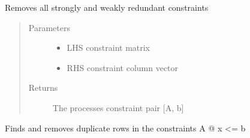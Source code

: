 \documentclass[letterpaper,10pt,english]{sphinxmanual}
\begin{document}
\begin{fulllineitems}
\label{\detokenize{mpo.utils:mpo.utils.constraint_utilities.process_region_constraints}}
\sphinxAtStartPar
Removes all strongly and weakly redundant constraints
\begin{quote}\begin{description}
\item[{Parameters}] \leavevmode\begin{itemize}
\item {} 
\sphinxAtStartPar
{} \textendash{} LHS constraint matrix

\item {} 
\sphinxAtStartPar
{} \textendash{} RHS constraint column vector

\end{itemize}

\item[{Returns}] \leavevmode
\sphinxAtStartPar
The processes constraint pair {[}A, b{]}

\end{description}\end{quote}

\end{fulllineitems}


\begin{fulllineitems}
\label{\detokenize{mpo.utils:mpo.utils.constraint_utilities.remove_duplicate_rows}}
\sphinxAtStartPar
Finds and removes duplicate rows in the constraints A @ x \textless{}= b

\end{fulllineitems}
\end{document}
